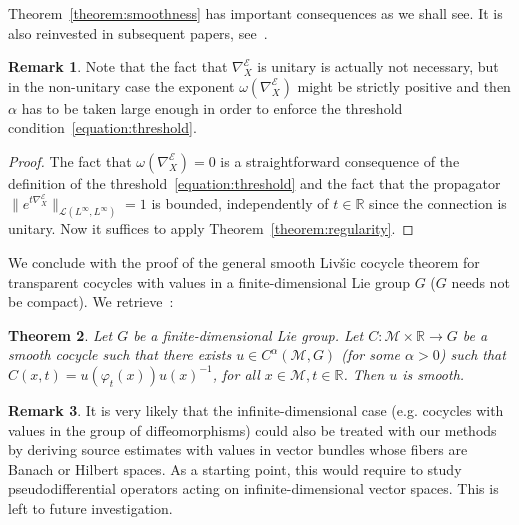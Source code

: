 \documentclass[10pt]{amsart}
\newtheorem{theo}{Theorem}[section]
\theoremstyle{definition}\newtheorem{defi}[theo]{Definition}\newtheorem{rema}[theo]{Remark}\newtheorem{exam}[theo]{Example}\newtheorem{exem}[theo]{Example}\newtheorem{nota}[theo]{Notation}
\newcommand{\R}{\mathbb{R}}
\newcommand{\mc}{\mathcal}
\newcommand{\M}{\mathcal{M}}
\newcommand{\E}{\mathcal{E}}
\begin{document}
Theorem~\ref{theorem:smoothness} has important consequences as we shall see. It is also reinvested in subsequent papers, see~\cite{Cekic-Lefeuvre-21-1, Cekic-Lefeuvre-21-2}.

\begin{rema}
Note that the fact that $\nabla^{\E}_X$ is unitary is actually not necessary, but in the non-unitary case the exponent $\omega(\nabla^{\E}_X)$ might be strictly positive and then $\alpha$ has to be taken large enough in order to enforce the threshold condition~\eqref{equation:threshold}.
\end{rema}

\begin{proof}
The fact that $\omega(\nabla^{\E}_X) = 0$ is a straightforward consequence of the definition of the threshold~\eqref{equation:threshold} and the fact that the propagator $\|e^{t\nabla^{\E}_X}\|_{\mc{L}(L^\infty,L^\infty)} = 1$ is bounded, independently of $t \in \R$ since the connection is unitary. Now it suffices to apply Theorem~\ref{theorem:regularity}.
\end{proof}



We conclude with the proof of the general smooth Liv{\v s}ic cocycle theorem for transparent cocycles with values in a finite-dimensional Lie group $G$ ($G$ needs not be compact). We retrieve~\cite[Theorem~2.4]{Nitica-Torok-98}:

\begin{theo}\label{theorem:nt}
Let $G$ be a finite-dimensional Lie group. Let $C : \M \times \R \rightarrow G$ be a smooth cocycle such that there exists $u \in C^\alpha(\M,G)$ (for some $\alpha > 0$) such that $C(x,t)=u(\varphi_t(x))u(x)^{-1}$, for all $x \in \M, t \in \R$. Then $u$ is smooth.
\end{theo}

\begin{rema}
It is very likely that the infinite-dimensional case (e.g. cocycles with values in the group of diffeomorphisms) could also be treated with our methods by deriving source estimates with values in vector bundles whose fibers are Banach or Hilbert spaces. As a starting point, this would require to study pseudodifferential operators acting on infinite-dimensional vector spaces. This is left to future investigation.
\end{rema}
\end{document}
